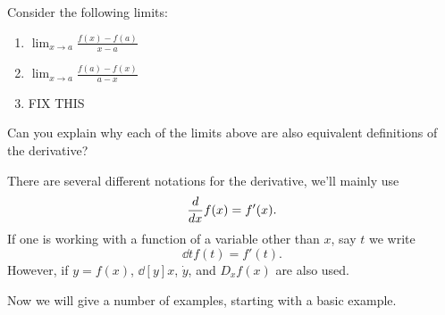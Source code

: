 \documentclass{ximera}
\begin{document}




\begin{question} 


Consider the following limits:
\begin{enumerate}
\item $\lim_{x\to a} \frac{f(x)-f(a)}{x-a}$\\
\item $\lim_{x\to a} \frac{f(a)-f(x)}{a-x}$\\
\item FIX THIS
\end{enumerate}
Can you explain why each of the limits above are also equivalent
definitions of the derivative?
\end{question}

\begin{definition}
There are several different notations for the derivative, we'll mainly
use
\[
\frac{d}{dx} f(x) = f'(x).
\]
If one is working with a function of a variable other than $x$, say $t$ we write
\[
\dd{t} f(t) = f'(t).
\]
However, if $y = f(x)$, $\dd[y]{x}$, $\dot{y}$, and $D_x f(x)$ are
also used.
\end{definition}

Now we will give a number of examples, starting with a basic example.
\end{document}
